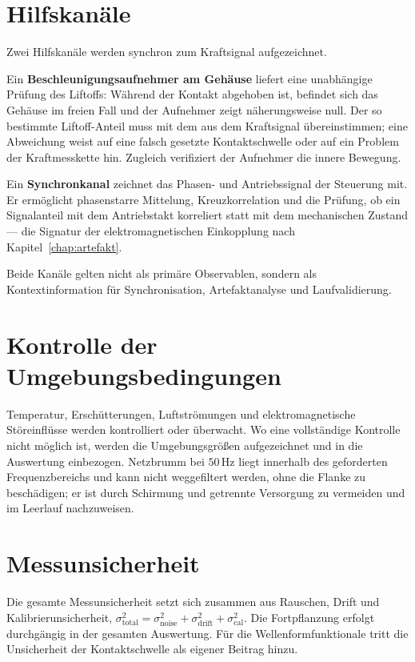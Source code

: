 \documentclass[12pt,a4paper]{report}
\begin{document}
\section{Hilfskanäle}

Zwei Hilfskanäle werden synchron zum Kraftsignal aufgezeichnet.

Ein \textbf{Beschleunigungsaufnehmer am Gehäuse} liefert eine
unabhängige Prüfung des Liftoffs: Während der Kontakt abgehoben ist,
befindet sich das Gehäuse im freien Fall und der Aufnehmer zeigt
näherungsweise null. Der so bestimmte Liftoff-Anteil muss mit dem aus
dem Kraftsignal übereinstimmen; eine Abweichung weist auf eine falsch
gesetzte Kontaktschwelle oder auf ein Problem der Kraftmesskette hin.
Zugleich verifiziert der Aufnehmer die innere Bewegung.

Ein \textbf{Synchronkanal} zeichnet das Phasen- und Antriebssignal der
Steuerung mit. Er ermöglicht phasenstarre Mittelung, Kreuzkorrelation
und die Prüfung, ob ein Signalanteil mit dem Antriebstakt korreliert
statt mit dem mechanischen Zustand --- die Signatur der
elektromagnetischen Einkopplung nach Kapitel~\ref{chap:artefakt}.

Beide Kanäle gelten nicht als primäre Observablen, sondern als
Kontextinformation für Synchronisation, Artefaktanalyse und
Laufvalidierung.

\section{Kontrolle der Umgebungsbedingungen}

Temperatur, Erschütterungen, Luftströmungen und elektromagnetische
Störeinflüsse werden kontrolliert oder überwacht. Wo eine vollständige
Kontrolle nicht möglich ist, werden die Umgebungsgrößen aufgezeichnet
und in die Auswertung einbezogen. Netzbrumm bei $50\,\mathrm{Hz}$ liegt
innerhalb des geforderten Frequenzbereichs und kann nicht weggefiltert
werden, ohne die Flanke zu beschädigen; er ist durch Schirmung und
getrennte Versorgung zu vermeiden und im Leerlauf nachzuweisen.

\section{Messunsicherheit}

Die gesamte Messunsicherheit setzt sich zusammen aus Rauschen, Drift
und Kalibrierunsicherheit,
$\sigma_{\text{total}}^2 = \sigma_{\text{noise}}^2 + \sigma_{\text{drift}}^2 + \sigma_{\text{cal}}^2$.
Die Fortpflanzung erfolgt durchgängig in der gesamten Auswertung. Für die
Wellenformfunktionale tritt die Unsicherheit der Kontaktschwelle als
eigener Beitrag hinzu.
\end{document}
